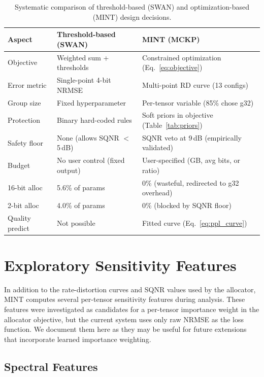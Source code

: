 \documentclass{article}
\begin{document}
\begin{table}[h]
\centering
\small
\caption{Systematic comparison of threshold-based (SWAN) and optimization-based (MINT) design decisions.}
\label{tab:v1v2}
\begin{tabular}{p{3cm}p{4.5cm}p{4.5cm}}
\toprule
Aspect & Threshold-based (SWAN) & MINT (MCKP) \\
\midrule
Objective & Weighted sum + thresholds & Constrained optimization (Eq.~\ref{eq:objective}) \\
Error metric & Single-point 4-bit NRMSE & Multi-point RD curve (13 configs) \\
Group size & Fixed hyperparameter & Per-tensor variable (85\% chose g32) \\
Protection & Binary hard-coded rules & Soft priors in objective (Table~\ref{tab:priors}) \\
Safety floor & None (allows SQNR $<$ 5\,dB) & SQNR veto at 9\,dB (empirically validated) \\
Budget & No user control (fixed output) & User-specified (GB, avg bits, or ratio) \\
16-bit alloc & 5.6\% of params & 0\% (wasteful, redirected to g32 overhead) \\
2-bit alloc & 4.0\% of params & 0\% (blocked by SQNR floor) \\
Quality predict & Not possible & Fitted curve (Eq.~\ref{eq:ppl_curve}) \\
\bottomrule
\end{tabular}
\end{table}

\section{Exploratory Sensitivity Features}
\label{app:features}

In addition to the rate-distortion curves and SQNR values used by the allocator, MINT computes several per-tensor sensitivity features during analysis. These features were investigated as candidates for a per-tensor importance weight in the allocator objective, but the current system uses only raw NRMSE as the loss function. We document them here as they may be useful for future extensions that incorporate learned importance weighting.

\subsection{Spectral Features}
\end{document}
